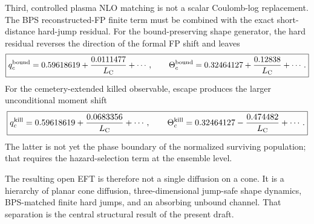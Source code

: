 \documentclass[11pt]{article}
\theoremstyle{remark}
\newcommand{\1}{\mathbf 1}
\begin{document}
Third, controlled plasma NLO matching is not a scalar Coulomb-log replacement.
The BPS reconstructed-FP finite term must be combined with the exact
short-distance hard-jump residual.  For the bound-preserving shape generator,
the hard residual reverses the direction of the formal FP shift and leaves
\[
\boxed{
q_c^{\rm bound}
=
0.59618619+\frac{0.0111477}{L_{\rm C}}+\cdots,
\qquad
\Theta_c^{\rm bound}
=
0.32464127+\frac{0.12838}{L_{\rm C}}+\cdots.
}
\]
For the cemetery-extended killed observable, escape produces the larger
unconditional moment shift
\[
\boxed{
q_c^{\rm kill}
=
0.59618619+\frac{0.0683356}{L_{\rm C}}+\cdots,
\qquad
\Theta_c^{\rm kill}
=
0.32464127-\frac{0.474482}{L_{\rm C}}+\cdots.
}
\]
The latter is not yet the phase boundary of the normalized surviving
population; that requires the hazard-selection term at the ensemble level.

The resulting open EFT is therefore not a single diffusion on a cone.  It is
a hierarchy of planar cone diffusion, three-dimensional jump-safe shape
dynamics, BPS-matched finite hard jumps, and an absorbing unbound channel.
That separation is the central structural result of the present draft.
\end{document}
